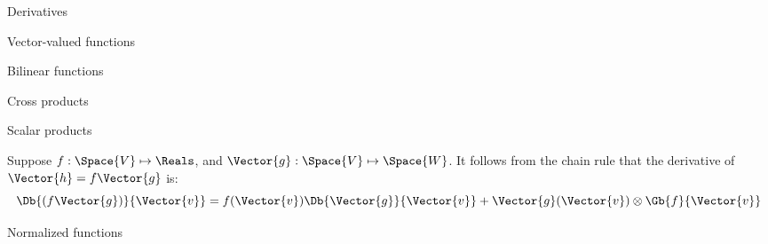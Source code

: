 \begin{plSection}{Derivatives}
\begin{plSection}{Vector-valued functions}
\begin{plSection}{Bilinear functions}
\begin{plSection}{Cross products}
\end{plSection}%
\end{plSection}%
\begin{plSection}{Scalar products}
\label{sec:Derivatives-of-scalar-products}

Suppose
$f:\Space{V} \mapsto \Reals$, and
$\Vector{g}:\Space{V} \mapsto \Space{W}$.
It follows from the chain rule that the derivative of $\Vector{h} = f\Vector{g}$ is:
\begin{equation}
\label{eq:scalar_product_derivative}
\Db{(f\Vector{g})}{\Vector{v}} =  f(\Vector{v}) \Db{\Vector{g}}{\Vector{v}} + \Vector{g}(\Vector{v}) \otimes \Gb{f}{\Vector{v}}
\end{equation}

\end{plSection}%
\begin{plSection}{Normalized functions}
\label{sec:Derivatives-of-normalized-functionss}


\end{plSection}
\end{plSection}
\end{plSection}
